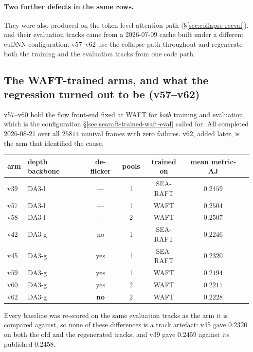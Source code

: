 \documentclass[11pt,a4paper]{article}
\begin{document}
\paragraph{Two further defects in the same rows.} They were also produced on the token-level
attention path (\S\ref{sec:collapse-reeval}), and their evaluation tracks came from a 2026-07-09
cache built under a different cuDNN configuration. v57--v62 use the collapse path throughout and
regenerate both the training and the evaluation tracks from one code path.

\subsection{The WAFT-trained arms, and what the regression turned out to be (v57--v62)}
\label{sec:waft-trained-arms}

v57--v60 hold the flow front-end fixed at WAFT for \emph{both} training and evaluation, which is the
configuration \S\ref{sec:searaft-trained-waft-eval} called for. All completed 2026-08-21 over all
$25814$ minival frames with zero failures. v62, added later, is the arm that identified the cause.

\begin{center}
\begin{tabular}{llccccc}
\toprule
arm & depth backbone & de-flicker & pools & trained on & mean metric-AJ \\
\midrule
v39 & DA3-l & --- & 1 & SEA-RAFT & $0.2459$ \\
v57 & DA3-l & --- & 1 & WAFT     & $\mathbf{0.2504}$ \\
v58 & DA3-l & --- & 2 & WAFT     & $0.2507$ \\
\midrule
v42 & DA3-g & no  & 1 & SEA-RAFT & $0.2246$ \\
v45 & DA3-g & yes & 1 & SEA-RAFT & $\mathbf{0.2320}$ \\
v59 & DA3-g & yes & 1 & WAFT     & $0.2194$ \\
v60 & DA3-g & yes & 2 & WAFT     & $0.2211$ \\
v62 & DA3-g & \textbf{no} & 2 & WAFT & $0.2228$ \\
\bottomrule
\end{tabular}
\end{center}

\noindent Every baseline was re-scored on the same evaluation tracks as the arm it is compared
against, so none of these differences is a track artefact: v45 gave $0.2320$ on both the old and the
regenerated tracks, and v39 gave $0.2459$ against its published $0.2458$.
\end{document}
